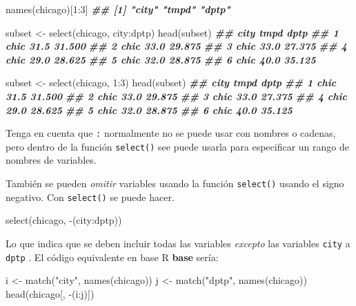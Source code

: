 \documentclass[
]{book}
\newenvironment{Shaded}{\begin{snugshade}}{\end{snugshade}}
\newcommand{\DecValTok}[1]{\textcolor[rgb]{0.00,0.00,0.81}{#1}}
\newcommand{\DocumentationTok}[1]{\textcolor[rgb]{0.56,0.35,0.01}{\textbf{\textit{#1}}}}
\newcommand{\FunctionTok}[1]{\textcolor[rgb]{0.00,0.00,0.00}{#1}}
\newcommand{\NormalTok}[1]{#1}
\newcommand{\OtherTok}[1]{\textcolor[rgb]{0.56,0.35,0.01}{#1}}
\newcommand{\SpecialCharTok}[1]{\textcolor[rgb]{0.00,0.00,0.00}{#1}}
\newcommand{\StringTok}[1]{\textcolor[rgb]{0.31,0.60,0.02}{#1}}
\begin{document}
\begin{Shaded}
\begin{Highlighting}[]
\FunctionTok{names}\NormalTok{(chicago)[}\DecValTok{1}\SpecialCharTok{:}\DecValTok{3}\NormalTok{]}
\DocumentationTok{\#\# [1] "city" "tmpd" "dptp"}

\NormalTok{subset }\OtherTok{\textless{}{-}} \FunctionTok{select}\NormalTok{(chicago, city}\SpecialCharTok{:}\NormalTok{dptp) }
\FunctionTok{head}\NormalTok{(subset)}
\DocumentationTok{\#\#   city tmpd   dptp}
\DocumentationTok{\#\# 1 chic 31.5 31.500}
\DocumentationTok{\#\# 2 chic 33.0 29.875}
\DocumentationTok{\#\# 3 chic 33.0 27.375}
\DocumentationTok{\#\# 4 chic 29.0 28.625}
\DocumentationTok{\#\# 5 chic 32.0 28.875}
\DocumentationTok{\#\# 6 chic 40.0 35.125}

\NormalTok{subset }\OtherTok{\textless{}{-}} \FunctionTok{select}\NormalTok{(chicago, }\DecValTok{1}\SpecialCharTok{:}\DecValTok{3}\NormalTok{)}
\FunctionTok{head}\NormalTok{(subset)}
\DocumentationTok{\#\#   city tmpd   dptp}
\DocumentationTok{\#\# 1 chic 31.5 31.500}
\DocumentationTok{\#\# 2 chic 33.0 29.875}
\DocumentationTok{\#\# 3 chic 33.0 27.375}
\DocumentationTok{\#\# 4 chic 29.0 28.625}
\DocumentationTok{\#\# 5 chic 32.0 28.875}
\DocumentationTok{\#\# 6 chic 40.0 35.125}
\end{Highlighting}
\end{Shaded}

Tenga en cuenta que \texttt{:} normalmente no se puede usar con nombres o cadenas, pero dentro de la función \texttt{select()} see puede usarla para especificar un rango de nombres de variables.

También se pueden \emph{omitir} variables usando la función \texttt{select()} usando el signo negativo. Con \texttt{select()} se puede hacer.

\begin{Shaded}
\begin{Highlighting}[]
\FunctionTok{select}\NormalTok{(chicago, }\SpecialCharTok{{-}}\NormalTok{(city}\SpecialCharTok{:}\NormalTok{dptp))}
\end{Highlighting}
\end{Shaded}

Lo que indica que se deben incluir todas las variables \emph{excepto} las variables \texttt{city} a \texttt{dptp} . El código equivalente en base R \textbf{base} sería:

\begin{Shaded}
\begin{Highlighting}[]
\NormalTok{i }\OtherTok{\textless{}{-}} \FunctionTok{match}\NormalTok{(}\StringTok{"city"}\NormalTok{, }\FunctionTok{names}\NormalTok{(chicago))}
\NormalTok{j }\OtherTok{\textless{}{-}} \FunctionTok{match}\NormalTok{(}\StringTok{"dptp"}\NormalTok{, }\FunctionTok{names}\NormalTok{(chicago))}
\FunctionTok{head}\NormalTok{(chicago[, }\SpecialCharTok{{-}}\NormalTok{(i}\SpecialCharTok{:}\NormalTok{j)])}
\end{Highlighting}
\end{Shaded}
\end{document}
